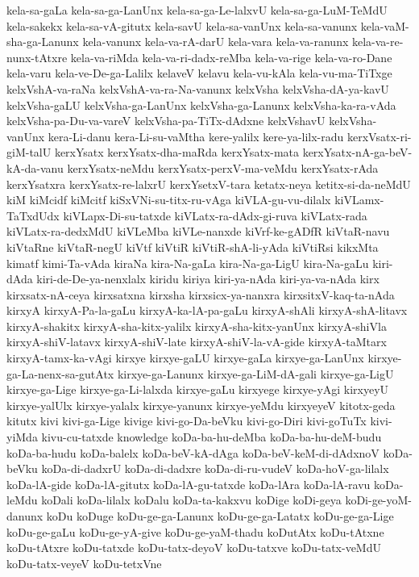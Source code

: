 {kela-sa-gaLa
kela-sa-ga-LanUnx
kela-sa-ga-Le-lalxvU
kela-sa-ga-LuM-TeMdU
kela-sakekx
kela-sa-vA-gitutx
kela-savU
kela-sa-vanUnx
kela-sa-vanunx
kela-vaM-sha-ga-Lanunx
kela-vanunx
kela-va-rA-darU
kela-vara
kela-va-ranunx
kela-va-re-nunx-tAtxre
kela-va-riMda
kela-va-ri-dadx-reMba
kela-va-rige
kela-va-ro-Dane
kela-varu
kela-ve-De-ga-Lalilx
kelaveV
kelavu
kela-vu-kAla
kela-vu-ma-TiTxge
kelxVshA-va-raNa
kelxVshA-va-ra-Na-vanunx
kelxVsha
kelxVsha-dA-ya-kavU
kelxVsha-gaLU
kelxVsha-ga-LanUnx
kelxVsha-ga-Lanunx
kelxVsha-ka-ra-vAda
kelxVsha-pa-Du-va-vareV
kelxVsha-pa-TiTx-dAdxne
kelxVshavU
kelxVsha-vanUnx
kera-Li-danu
kera-Li-su-vaMtha
kere-yalilx
kere-ya-lilx-radu
kerxVsatx-ri-giM-talU
kerxYsatx
kerxYsatx-dha-maRda
kerxYsatx-mata
kerxYsatx-nA-ga-beV-kA-da-vanu
kerxYsatx-neMdu
kerxYsatx-perxV-ma-veMdu
kerxYsatx-rAda
kerxYsatxra
kerxYsatx-re-lalxrU
kerxYsetxV-tara
ketatx-neya
ketitx-si-da-neMdU
kiM
kiMcidf
kiMcitf
kiSxVNi-su-titx-ru-vAga
kiVLA-gu-vu-dilalx
kiVLamx-TaTxdUdx
kiVLapx-Di-su-tatxde
kiVLatx-ra-dAdx-gi-ruva
kiVLatx-rada
kiVLatx-ra-dedxMdU
kiVLeMba
kiVLe-nanxde
kiVrf-ke-gADfR
kiVtaR-navu
kiVtaRne
kiVtaR-negU
kiVtf
kiVtiR
kiVtiR-shA-li-yAda
kiVtiRsi
kikxMta
kimatf
kimi-Ta-vAda
kiraNa
kira-Na-gaLa
kira-Na-ga-LigU
kira-Na-gaLu
kiri-dAda
kiri-de-De-ya-nenxlalx
kiridu
kiriya
kiri-ya-nAda
kiri-ya-va-nAda
kirx
kirxsatx-nA-ceya
kirxsatxna
kirxsha
kirxsicx-ya-nanxra
kirxsitxV-kaq-ta-nAda
kirxyA
kirxyA-Pa-la-gaLu
kirxyA-ka-lA-pa-gaLu
kirxyA-shAli
kirxyA-shA-litavx
kirxyA-shakitx
kirxyA-sha-kitx-yalilx
kirxyA-sha-kitx-yanUnx
kirxyA-shiVla
kirxyA-shiV-latavx
kirxyA-shiV-late
kirxyA-shiV-la-vA-gide
kirxyA-taMtarx
kirxyA-tamx-ka-vAgi
kirxye
kirxye-gaLU
kirxye-gaLa
kirxye-ga-LanUnx
kirxye-ga-La-nenx-sa-gutAtx
kirxye-ga-Lanunx
kirxye-ga-LiM-dA-gali
kirxye-ga-LigU
kirxye-ga-Lige
kirxye-ga-Li-lalxda
kirxye-gaLu
kirxyege
kirxye-yAgi
kirxyeyU
kirxye-yalUlx
kirxye-yalalx
kirxye-yanunx
kirxye-yeMdu
kirxyeyeV
kitotx-geda
kitutx
kivi
kivi-ga-Lige
kivige
kivi-go-Da-beVku
kivi-go-Diri
kivi-goTuTx
kivi-yiMda
kivu-cu-tatxde
knowledge
koDa-ba-hu-deMba
koDa-ba-hu-deM-budu
koDa-ba-hudu
koDa-balelx
koDa-beV-kA-dAga
koDa-beV-keM-di-dAdxnoV
koDa-beVku
koDa-di-dadxrU
koDa-di-dadxre
koDa-di-ru-vudeV
koDa-hoV-ga-lilalx
koDa-lA-gide
koDa-lA-gitutx
koDa-lA-gu-tatxde
koDa-lAra
koDa-lA-ravu
koDa-leMdu
koDali
koDa-lilalx
koDalu
koDa-ta-kakxvu
koDige
koDi-geya
koDi-ge-yoM-danunx
koDu
koDuge
koDu-ge-ga-Lanunx
koDu-ge-ga-Latatx
koDu-ge-ga-Lige
koDu-ge-gaLu
koDu-ge-yA-give
koDu-ge-yaM-thadu
koDutAtx
koDu-tAtxne
koDu-tAtxre
koDu-tatxde
koDu-tatx-deyoV
koDu-tatxve
koDu-tatx-veMdU
koDu-tatx-veyeV
koDu-tetxVne
}
